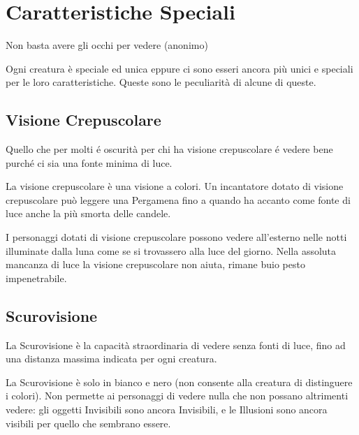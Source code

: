 \section{Caratteristiche Speciali}

\begin{changemargin}{0.3cm}{0.3cm}\begin{enfasi}{
\begin{center}
Non basta avere gli occhi per vedere (anonimo)
\end{center}
}\end{enfasi}\end{changemargin}\medskip

\begin{multicols}{2}

Ogni creatura è speciale ed unica eppure ci sono esseri ancora più unici e speciali per le loro caratteristiche. Queste sono le peculiarità di alcune di queste.

\subsection{Visione Crepuscolare}\label{visionecrepuscolare}

Quello che per molti é oscurità per chi ha \hypertarget{visionecrepuscolare}{visione crepuscolare} é vedere bene purché ci sia una fonte minima di luce.

La visione crepuscolare è una visione a colori.
Un incantatore dotato di visione crepuscolare può leggere una Pergamena fino a quando ha accanto come fonte di luce anche la più smorta delle candele.

I personaggi dotati di visione crepuscolare possono vedere all'esterno nelle notti illuminate dalla luna come se si trovassero alla luce del giorno.
Nella assoluta mancanza di luce la visione crepuscolare non aiuta, rimane buio pesto impenetrabile.

\subsection{Scurovisione}\label{scurovisione}

La Scurovisione è la capacità straordinaria di vedere senza fonti di luce, fino ad una distanza massima indicata per ogni creatura.

La Scurovisione è solo in bianco e nero (non consente alla creatura di distinguere i colori). Non permette ai personaggi di vedere nulla che non possano altrimenti vedere: gli oggetti Invisibili sono ancora Invisibili, e le Illusioni sono ancora visibili per quello che sembrano essere.


\end{multicols}
